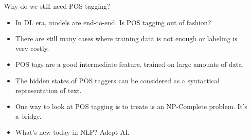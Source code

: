 \documentclass[11pt, handout]{beamer}
\begin{document}
\begin{frame}{Why do we still need POS tagging? }
  \begin{itemize}[<+->]
    \item In DL era, models are end-to-end. Is POS tagging out of fashion? 
    \item There are still many cases where training data is not enough or labeling is very costly. 
    \item POS tags are a good intermediate feature, trained on large amounts of data. 
    \item The hidden states of POS taggers can be considered as a syntactical  representation of text. 
    \item One way to look at POS tagging is to treate is an NP-Complete problem. It's a bridge. 
    \item What's new today in NLP? Adept AI. 
  \end{itemize}
\end{frame}
\end{document}
